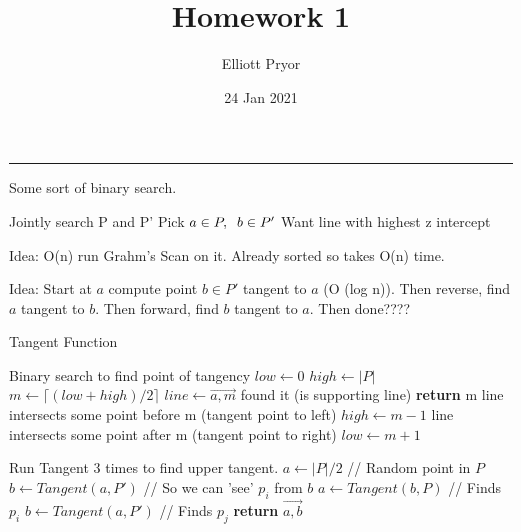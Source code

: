 \documentclass[11pt]{article}
\title{Homework 1}
\author{Elliott Pryor}
\date{24 Jan 2021}
\begin{document}
\maketitle

\hrule

Some sort of binary search. 

Jointly search P and P'
Pick $a \in P, \sp b \in P'$
Want line with highest z intercept

Idea: O(n) run Grahm's Scan on it. Already sorted so takes O(n) time.

Idea: Start at $a$ compute point $b \in P'$ tangent to $a$ (O (log n)). 
Then reverse, find $a$ tangent to $b$. Then forward, find $b$ tangent to $a$. Then done????

\begin{algorithm}
    \caption{Tangent Function}\label{guests}
    \begin{algorithmic}[1]
        \State Binary search to find point of tangency
        \State $low \gets 0$
        \State $high \gets |P|$
            \State $m \gets \lceil (low + high)/2 \rceil$
            \State $line \gets \overrightarrow{a,m}$
                \State found it (is supporting line)
                \State \textbf{return} m
                \State line intersects some point before m (tangent point to left)
                \State $high \gets m - 1$
                \State line intersects some point after m (tangent point to right)
                \State $low \gets m + 1$
            \EndIf
        \EndWhile
    \EndFunction
    \end{algorithmic}

    \begin{algorithmic}[1]
            \State Run Tangent 3 times to find upper tangent.
            \State $a \gets |P|/2$ \quad // Random point in $P$
            \State $b \gets Tangent(a, P')$ \quad // So we can 'see' $p_i$ from $b$
            \State $a \gets Tangent(b, P)$ \quad // Finds $p_i$
            \State $b \gets Tangent(a, P')$ \quad // Finds $p_j$
            \State \textbf{return} $\overrightarrow{a,b}$
        \EndFunction
        \end{algorithmic}

\end{algorithm}
\end{document}
